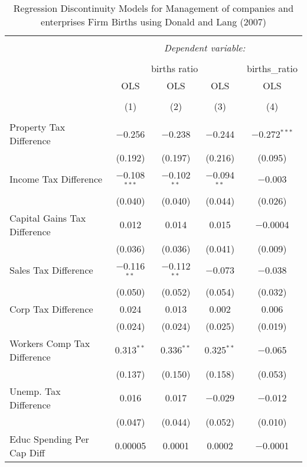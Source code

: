 
\begin{table}[!htbp] \centering 
  \caption{Regression Discontinuity Models for  Management of companies and enterprises Firm Births using Donald and Lang (2007)} 
  \label{} 
\begin{tabular}{@{\extracolsep{5pt}}lcccc} 
\\[-1.8ex]\hline 
\hline \\[-1.8ex] 
 & \multicolumn{4}{c}{\textit{Dependent variable:}} \\ 
\cline{2-5} 
\\[-1.8ex] & \multicolumn{3}{c}{births ratio} & births\_ratio \\ 
 & OLS & OLS & OLS & OLS \\ 
\\[-1.8ex] & (1) & (2) & (3) & (4)\\ 
\hline \\[-1.8ex] 
 Property Tax Difference & $-$0.256 & $-$0.238 & $-$0.244 & $-$0.272$^{***}$ \\ 
  & (0.192) & (0.197) & (0.216) & (0.095) \\ 
  Income Tax Difference & $-$0.108$^{***}$ & $-$0.102$^{**}$ & $-$0.094$^{**}$ & $-$0.003 \\ 
  & (0.040) & (0.040) & (0.044) & (0.026) \\ 
  Capital Gains Tax Difference & 0.012 & 0.014 & 0.015 & $-$0.0004 \\ 
  & (0.036) & (0.036) & (0.041) & (0.009) \\ 
  Sales Tax Difference & $-$0.116$^{**}$ & $-$0.112$^{**}$ & $-$0.073 & $-$0.038 \\ 
  & (0.050) & (0.052) & (0.054) & (0.032) \\ 
  Corp Tax Difference & 0.024 & 0.013 & 0.002 & 0.006 \\ 
  & (0.024) & (0.024) & (0.025) & (0.019) \\ 
  Workers Comp Tax Difference & 0.313$^{**}$ & 0.336$^{**}$ & 0.325$^{**}$ & $-$0.065 \\ 
  & (0.137) & (0.150) & (0.158) & (0.053) \\ 
  Unemp. Tax Difference & 0.016 & 0.017 & $-$0.029 & $-$0.012 \\ 
  & (0.047) & (0.044) & (0.052) & (0.010) \\ 
  Educ Spending Per Cap Diff & 0.00005 & 0.0001 & 0.0002 & $-$0.0001 \\ 

\end{tabular}
\end{table}

